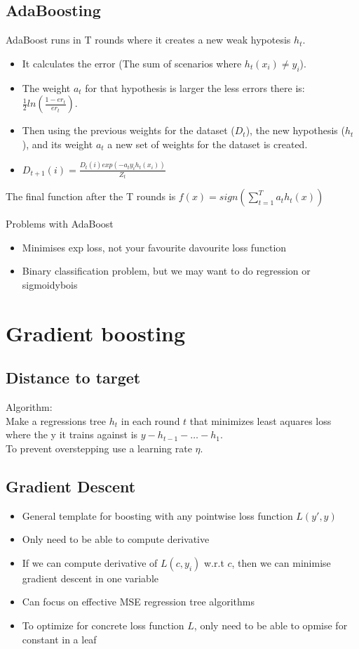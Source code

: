 \documentclass{article}
\begin{document}
  \subsection{AdaBoosting}
    AdaBoost runs in T rounds where it creates a new weak hypotesis $h_t$. 
    \begin{itemize}
        \item It calculates the error (The sum of scenarios where $h_t(x_i)\neq y_i$).
        \item The weight $a_t$ for that hypothesis is larger the less errors there is: $\frac{1}{2}ln(\frac{1-er_t}{er_t})$.
        \item Then using the previous weights for the dataset ($D_t$), the new hypothesis ($h_t$), and its weight $a_t$ a new set of weights for the dataset is created.
        \item $D_{t+1}(i)=\frac{D_t(i)exp(-a_ty_ih_t(x_i))}{Z_t}$
    \end{itemize}
    The final function after the T rounds is $f(x)=sign(\sum_{t=1}^Ta_th_t(x))$

    Problems with AdaBoost
    \begin{itemize}
      \item Minimises exp loss, not your favourite davourite loss function
      \item Binary classification problem, but we may want to do regression or sigmoidybois
    \end{itemize}

\section{Gradient boosting}
  \subsection{Distance to target}
    Algorithm:\\
    Make a regressions tree $h_t$ in each round $t$ that minimizes least aquares loss where the y it trains against is $y-h_{t-1}-\dots -h_1$.\\
    To prevent overstepping use a learning rate $\eta$.

  \subsection{Gradient Descent}
    \begin{itemize}
      \item General template for boosting with any pointwise loss function $L(y', y)$
      \item Only need to be able to compute derivative 
      \item If we can compute derivative of $L(c, y_i)$ w.r.t $c$, then we can minimise gradient descent in one variable
      \item Can focus on effective MSE regression tree algorithms
      \item To optimize for concrete loss function $L$, only need to be able to opmise for constant in a leaf
    \end{itemize}
\end{document}

